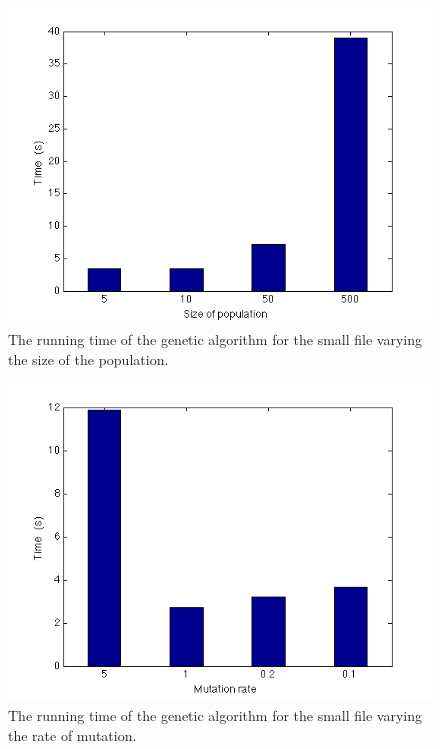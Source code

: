 \documentclass[titlepage,a4paper]{article}
\begin{document}
\begin{figure}[H]
  \begin{center}
    \includegraphics[scale=0.5]{../results/figures/genetic_population.png}
  \end{center}
  \caption{The running time of the genetic algorithm for the small file varying the size of the population.}
  \label{genetic_pop}
\end{figure}

\begin{figure}[H]
  \begin{center}
    \includegraphics[scale=0.5]{../results/figures/genetic_mutation.png}
  \end{center}
  \caption{The running time of the genetic algorithm for the small file varying the rate of mutation.}
  \label{genetic_pop}
\end{figure}
\end{document}
